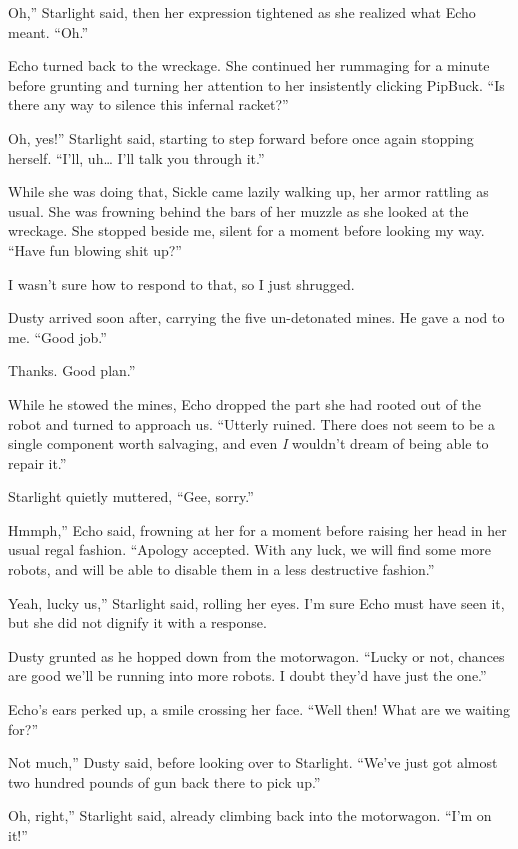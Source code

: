 \leavevmode{}Oh,” Starlight said, then her expression tightened as she realized what Echo meant. “Oh.”

Echo turned back to the wreckage. She continued her rummaging for a minute before grunting and turning her attention to her insistently clicking PipBuck. “Is there any way to silence this infernal racket?”

\leavevmode{}Oh, yes!” Starlight said, starting to step forward before once again stopping herself. “I’ll, uh… I’ll talk you through it.”

While she was doing that, Sickle came lazily walking up, her armor rattling as usual. She was frowning behind the bars of her muzzle as she looked at the wreckage. She stopped beside me, silent for a moment before looking my way. “Have fun blowing shit up?”

I wasn’t sure how to respond to that, so I just shrugged.

Dusty arrived soon after, carrying the five un-detonated mines. He gave a nod to me. “Good job.”

\leavevmode{}Thanks. Good plan.”

While he stowed the mines, Echo dropped the part she had rooted out of the robot and turned to approach us. “Utterly ruined. There does not seem to be a single component worth salvaging, and even \textit{I} wouldn’t dream of being able to repair it.”

Starlight quietly muttered, “Gee, sorry.”

\leavevmode{}Hmmph,” Echo said, frowning at her for a moment before raising her head in her usual regal fashion. “Apology accepted. With any luck, we will find some more robots, and will be able to disable them in a less destructive fashion.”

\leavevmode{}Yeah, lucky us,” Starlight said, rolling her eyes. I’m sure Echo must have seen it, but she did not dignify it with a response.

Dusty grunted as he hopped down from the motorwagon. “Lucky or not, chances are good we’ll be running into more robots. I doubt they’d have just the one.”

Echo’s ears perked up, a smile crossing her face. “Well then! What are we waiting for?”

\leavevmode{}Not much,” Dusty said, before looking over to Starlight. “We’ve just got almost two hundred pounds of gun back there to pick up.”

\leavevmode{}Oh, right,” Starlight said, already climbing back into the motorwagon. “I’m on it!”

